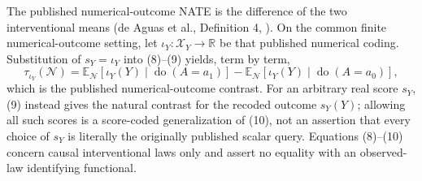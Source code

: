 The published numerical-outcome NATE is the difference of the two interventional means (de Aguas et al., Definition 4, \cite{pmlr-v286-aguas25a}).  On the common finite numerical-outcome setting, let \(\iota_Y:\mathcal X_Y\to\mathbb R\) be that published numerical coding.  Substitution of \(s_Y=\iota_Y\) into (8)--(9) yields, term by term,
\[
\tau_{\iota_Y}(\mathcal N)
=\mathbb E_{\mathcal N}\!\left[\iota_Y(Y)\mid\operatorname{do}(A=a_1)\right]
-\mathbb E_{\mathcal N}\!\left[\iota_Y(Y)\mid\operatorname{do}(A=a_0)\right],
\tag{10}
\]
which is the published numerical-outcome contrast.  For an arbitrary real score \(s_Y\), (9) instead gives the natural contrast for the recoded outcome \(s_Y(Y)\); allowing all such scores is a score-coded generalization of (10), not an assertion that every choice of \(s_Y\) is literally the originally published scalar query.  Equations (8)--(10) concern causal interventional laws only and assert no equality with an observed-law identifying functional.
